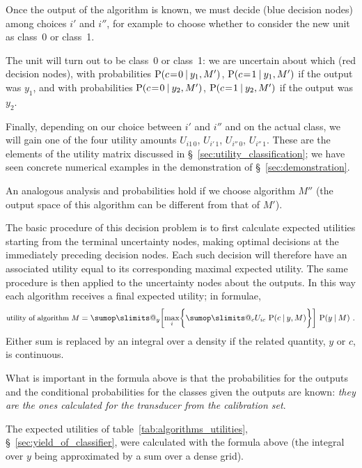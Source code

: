 \documentclass[\ifafour a4paper,12pt,\else a5paper,10pt,\fi%
onecolumn,oneside,article,%
british%
]{memoir}
\makeatletter
\theoremstyle{remark}
\theoremstyle{innote}
\def\sum{\DOTSI\sumop\slimits@}
\DeclarePairedDelimiter\set{\{}{\}} %
\renewcommand*{\P}{\mathrm{P}}%
\renewcommand*{\|}[1][]{\nonscript\:#1\vert\nonscript\:\mathopen{}}
\newcommand*{\mo}[1][=]{\mathrel{\mkern-3.5mu#1\mkern-3.5mu}}
\newcommand*{\sect}{\S}%
\newcommand*{\texts}[1]{\text{\small #1}}
\makeatother
\begin{document}
Once the output of the algorithm is known, we must decide (blue decision nodes) among choices $i'$ and $i''$, for example to choose whether to consider the new unit as class~0 or class~1.

The unit will turn out to be class~0 or class~1: we are uncertain about which (red decision nodes), with probabilities $\P(c\mo0 \| y_{1}, M')$, $\P(c\mo1 \| y_{1}, M')$ if the output was $y_{1}$, and with probabilities $\P(c\mo0 \| y_{2}, M')$, $\P(c\mo1 \| y_{2}, M')$ if the output was $y_{2}$.

Finally, depending on our choice between $i'$ and $i''$ and on the actual class, we will gain one of the four utility amounts $U_{i1\, 0}$, $U_{i'\, 1}$, $U_{i''\, 0}$, $U_{i''\, 1}$. These are the elements of the utility matrix discussed in \sect~\ref{sec:utility_classification}; we have seen concrete numerical examples in the demonstration of \sect~\ref{sec:demonstration}.

An analogous analysis and probabilities hold if we choose algorithm $M''$ (the output space of this algorithm can be different from that of $M'$).

The basic procedure of this decision problem is to first calculate expected utilities starting from the terminal uncertainty nodes, making optimal decisions at the immediately preceding decision nodes. Each such decision will therefore have an associated utility equal to its corresponding maximal expected utility. The same procedure is then applied to the uncertainty nodes about the outputs. In this way each algorithm receives a final expected utility; in formulae,
\begin{equation}
  \label{eq:algorithm_utility}
\texts{utility of algorithm $M$} =  \sum_{y} \biggl[\max_{i}\set[\bigg]{\sum_{c} U_{ic}\ \P(c \| y, M)}\biggr]\
  \P(y \| M) \ .
\end{equation}
Either sum is replaced by an integral over a density if the related quantity, $y$ or $c$, is continuous.

What is important in the formula above is that the probabilities for the outputs and the conditional probabilities for the classes given the outputs are known: \emph{they are the ones calculated for the transducer from the calibration set}.

The expected utilities of table~\ref{tab:algorithms_utilities}, \sect~\ref{sec:yield_of_classifier}, were calculated with the formula above (the integral over $y$ being approximated by a sum over a dense grid).

\medskip
\end{document}
